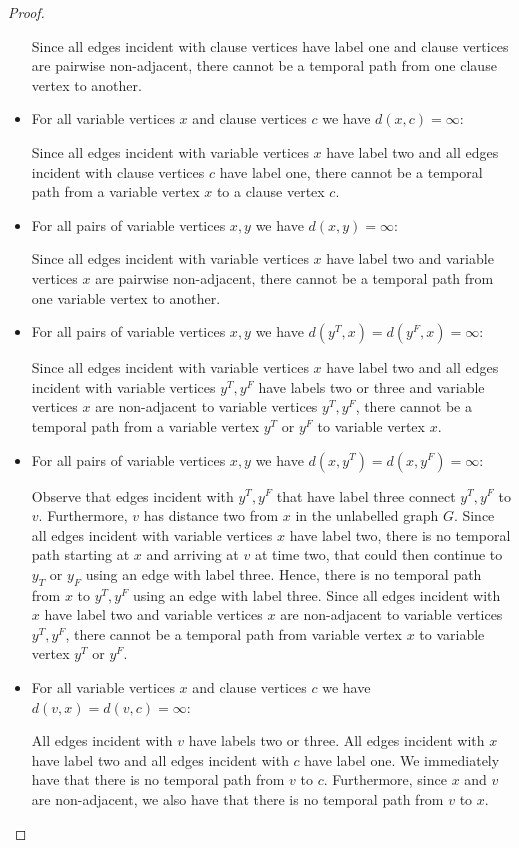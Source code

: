 \documentclass[11pt,a4paper]{article}
\theoremstyle{remark}
\theoremstyle{definition}
\begin{document}
\begin{proof}
\begin{itemize}
Since all edges incident with clause vertices have label one and clause vertices are pairwise non-adjacent, there cannot be a temporal path from one clause vertex to another.
\item For all variable vertices $x$ and clause vertices $c$ we have $d(x,c)=\infty$:

Since all edges incident with variable vertices $x$ have label two and all edges incident with clause vertices $c$ have label one, there cannot be a temporal path from a variable vertex $x$ to a clause vertex $c$.
\item For all pairs of variable vertices $x,y$ we have $d(x,y)=\infty$:

Since all edges incident with variable vertices $x$ have label two and variable vertices $x$ are pairwise non-adjacent, there cannot be a temporal path from one variable vertex to another.
\item For all pairs of variable vertices $x,y$ we have $d(y^T,x)=d(y^F,x)=\infty$:

Since all edges incident with variable vertices $x$ have label two and all edges incident with variable vertices $y^T, y^F$ have labels two or three and variable vertices $x$ are non-adjacent to variable vertices $y^T,y^F$, there cannot be a temporal path from a variable vertex $y^T$ or $y^F$ to variable vertex $x$.
\item For all pairs of variable vertices $x,y$ we have $d(x,y^T)=d(x,y^F)=\infty$:

Observe that edges incident with $y^T, y^F$ that have label three connect $y^T, y^F$ to $v$. Furthermore, $v$ has distance two from $x$ in the unlabelled graph $G$. Since all edges incident with variable vertices $x$ have label two, there is no temporal path starting at $x$ and arriving at $v$ at time two, that could then continue to $y_T$ or $y_F$ using an edge with label three. Hence, there is no temporal path from $x$ to $y^T, y^F$ using an edge with label three. Since all edges incident with $x$ have label two and variable vertices $x$ are non-adjacent to variable vertices $y^T,y^F$, there cannot be a temporal path from variable vertex $x$ to variable vertex $y^T$ or $y^F$.
\item For all variable vertices $x$ and clause vertices $c$ we have $d(v,x)=d(v,c)=\infty$:

All edges incident with $v$ have labels two or three. All edges incident with $x$ have label two and all edges incident with $c$ have label one. We immediately have that there is no temporal path from $v$ to $c$. Furthermore, since $x$ and $v$ are non-adjacent, we also have that there is no temporal path from $v$ to $x$.
\end{itemize}
\end{proof}

	
\end{document}
